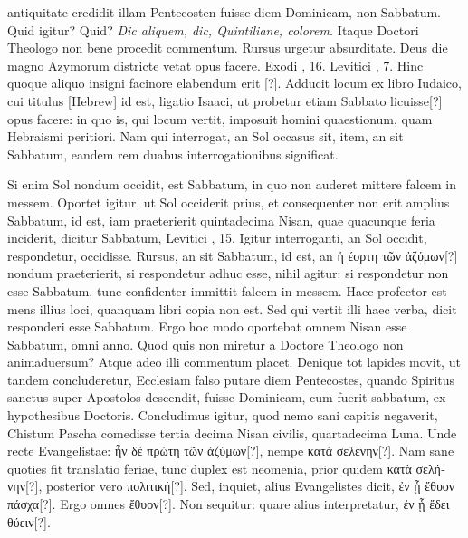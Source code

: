  antiquitate
credidit illam Pentecosten fuisse diem Dominicam, non
Sabbatum.
Quid igitur?
Quid?
\textit{\emd{} Dic aliquem, dic, Quintiliane, colorem.}
Itaque Doctori Theologo non bene procedit commentum.
Rursus urgetur absurditate.
Deus die magno Azymorum districte
vetat opus facere.
Exodi , 16.
Levitici , 7.
Hinc quoque
aliquo insigni facinore elabendum erit [?].
Adducit locum ex libro Iudaico,
cui titulus \texthebrew{[Hebrew]} id est, ligatio Isaaci, ut probetur etiam
Sabbato licuisse[?] opus facere: in quo is, qui locum vertit, imposuit homini
quaestionum, quam Hebraismi peritiori.
Nam qui interrogat,
an Sol occasus sit, item, an sit Sabbatum, eandem rem duabus interrogationibus
significat.

Si enim Sol nondum occidit, est Sabbatum,
in quo non auderet mittere falcem in messem.
Oportet igitur,
ut Sol occiderit prius, et consequenter non erit amplius Sabbatum,
id est, iam praeterierit quintadecima Nisan, quae quacunque feria
inciderit, dicitur Sabbatum, Levitici , 15.
Igitur interroganti,
an Sol occidit, respondetur, occidisse.
Rursus, an sit Sabbatum, id
est, an \textgreek{ἡ έορτη τῶν ἀζύμων[?]} nondum praeterierit,
 si respondetur adhuc
esse, nihil agitur: si respondetur non esse Sabbatum, tunc confidenter
immittit falcem in messem.
Haec profector est mens illius loci,
quanquam libri copia non est.
Sed qui vertit illi haec verba, dicit responderi
esse Sabbatum.
Ergo hoc modo oportebat omnem 
Nisan esse Sabbatum, omni anno.
Quod quis non miretur a Doctore
Theologo non animaduersum?
Atque adeo illi commentum
placet.
Denique tot lapides movit, ut tandem concluderetur, Ecclesiam
falso putare diem Pentecostes, quando Spiritus sanctus super
Apostolos descendit, fuisse Dominicam, cum fuerit sabbatum, ex
hypothesibus Doctoris.
Concludimus igitur, quod nemo sani capitis
negaverit, Chistum Pascha comedisse tertia decima Nisan civilis,
quartadecima Luna.
Unde recte Evangelistae: \textgreek{ἦν δὲ πρώτη τῶν
ἀζύμων[?]}, nempe \textgreek{κατὰ σελένην[?]}.
Nam sane quoties fit translatio feriae,
tunc duplex est neomenia, prior quidem \textgreek{κατὰ σελήνην[?]},
 posterior vero
\textgreek{πολιτική[?]}.
Sed, inquiet, alius Evangelistes dicit, \textgreek{ἐν ᾗ ἔθυον πάσχα[?]}.
Ergo omnes \textgreek{ἔθυον[?]}.
Non sequitur: quare alius interpretatur, \textgreek{ἐν ᾗ ἔδει θύειν[?]}.

